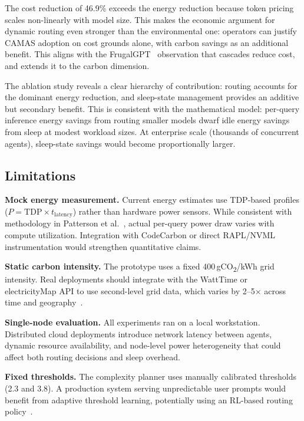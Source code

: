 \documentclass[journal]{IEEEtran}
\begin{document}
The cost reduction of 46.9\% exceeds the energy reduction because token pricing
scales non-linearly with model size. This makes the economic argument for
dynamic routing even stronger than the environmental one: operators can justify
CAMAS adoption on cost grounds alone, with carbon savings as an additional
benefit. This aligns with the FrugalGPT~\cite{chen2023frugalgpt} observation
that cascades reduce cost, and extends it to the carbon dimension.

The ablation study reveals a clear hierarchy of contribution: routing accounts
for the dominant energy reduction, and sleep-state management provides an
additive but secondary benefit. This is consistent with the mathematical model:
per-query inference energy savings from routing smaller models dwarf idle energy
savings from sleep at modest workload sizes. At enterprise scale (thousands of
concurrent agents), sleep-state savings would become proportionally larger.

\subsection{Limitations}

\textbf{Mock energy measurement.} Current energy estimates use TDP-based
profiles ($P = \text{TDP} \times t_{\text{latency}}$) rather than hardware
power sensors. While consistent with methodology in
Patterson et al.~\cite{patterson2021carbon}, actual per-query power draw varies
with compute utilization. Integration with CodeCarbon or direct RAPL/NVML
instrumentation would strengthen quantitative claims.

\textbf{Static carbon intensity.} The prototype uses a fixed
400\,gCO\textsubscript{2}/kWh grid intensity. Real deployments should integrate
with the WattTime or electricityMap API to use second-level grid data, which
varies by 2--5$\times$ across time and geography~\cite{radovanovic2022carbon}.

\textbf{Single-node evaluation.} All experiments ran on a local workstation.
Distributed cloud deployments introduce network latency between agents, dynamic
resource availability, and node-level power heterogeneity that could affect
both routing decisions and sleep overhead.

\textbf{Fixed thresholds.} The complexity planner uses manually calibrated
thresholds (2.3 and 3.8). A production system serving unpredictable user
prompts would benefit from adaptive threshold learning, potentially using an
RL-based routing policy~\cite{shao2024routellm}.
\end{document}
